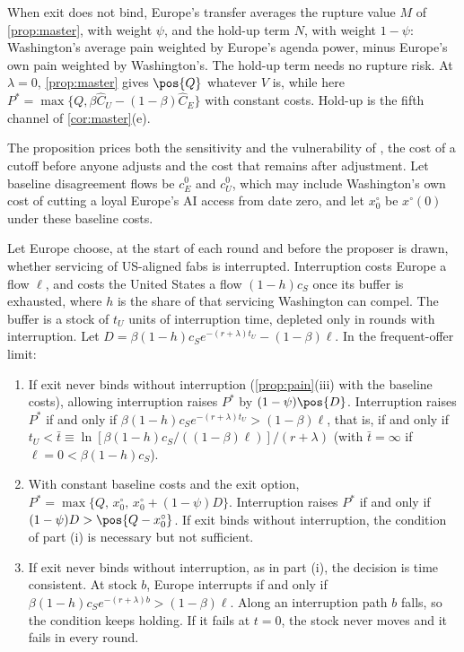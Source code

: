 When exit does not bind, Europe's transfer averages the rupture value $M$ of \cref{prop:master}, with weight $\psi$, and the hold-up term $N$, with weight $1-\psi$: Washington's average pain weighted by Europe's agenda power, minus Europe's own pain weighted by Washington's. The hold-up term needs no rupture risk. At $\lambda=0$, \cref{prop:master} gives $\pos{Q}$ whatever $V$ is, while here $P^*=\max\{Q,\beta\hat C_U-(1-\beta)\hat C_E\}$ with constant costs. Hold-up is the fifth channel of \cref{cor:master}(e).

The proposition prices both the sensitivity and the vulnerability of \citet{keohane1977power}, the cost of a cutoff before anyone adjusts and the cost that remains after adjustment. Let baseline disagreement flows be $c_E^0$ and $c_U^0$, which may include Washington's own cost of cutting a loyal Europe's AI access from date zero, and let $x^\circ_0$ be $x^\circ(0)$ under these baseline costs.

\begin{corollary}[Interruption]\label{cor:interrupt}
Let Europe choose, at the start of each round and before the proposer is drawn, whether servicing of US-aligned fabs is interrupted. Interruption costs Europe a flow $\ell$, and costs the United States a flow $(1-h)c_S$ once its buffer is exhausted, where $h$ is the share of that servicing Washington can compel. The buffer is a stock of $t_U$ units of interruption time, depleted only in rounds with interruption. Let $D=\beta(1-h)c_Se^{-(r+\lambda)t_U}-(1-\beta)\ell$. In the frequent-offer limit:
\begin{enumerate}[label=(\roman*)]
\item If exit never binds without interruption (\cref{prop:pain}(iii) with the baseline costs), allowing interruption raises $P^*$ by $(1-\psi)\pos{D}$. Interruption raises $P^*$ if and only if $\beta(1-h)c_Se^{-(r+\lambda)t_U}>(1-\beta)\ell$, that is, if and only if $t_U<\bar t\equiv\ln[\beta(1-h)c_S/((1-\beta)\ell)]/(r+\lambda)$ (with $\bar t=\infty$ if $\ell=0<\beta(1-h)c_S$).
\item With constant baseline costs and the exit option, $P^*=\max\{Q,\,x^\circ_0,\,x^\circ_0+(1-\psi)D\}$. Interruption raises $P^*$ if and only if $(1-\psi)D>\pos{Q-x^\circ_0}$. If exit binds without interruption, the condition of part (i) is necessary but not sufficient.
\item If exit never binds without interruption, as in part (i), the decision is time consistent. At stock $b$, Europe interrupts if and only if $\beta(1-h)c_Se^{-(r+\lambda)b}>(1-\beta)\ell$. Along an interruption path $b$ falls, so the condition keeps holding. If it fails at $t=0$, the stock never moves and it fails in every round.
\end{enumerate}
\end{corollary}

